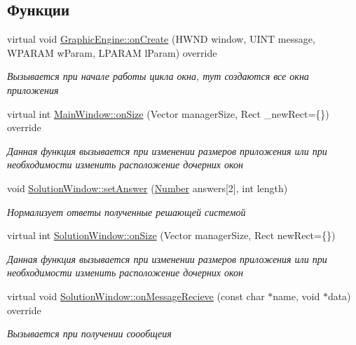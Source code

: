 \subsection*{Функции}
\begin{DoxyCompactItemize}
\item 
virtual void \hyperlink{group___u_i_ga153ee021b4561079e10d503826635a0f}{GraphicEngine::onCreate} (HWND window, UINT message, WPARAM wParam, LPARAM lParam) override
\begin{DoxyCompactList}\small\item\em Вызывается при начале работы цикла окна, тут создаются все окна приложения \item\end{DoxyCompactList}\item 
virtual int \hyperlink{group___u_i_gae135fdc461d4d39e884509fae4064aa5}{MainWindow::onSize} (Vector managerSize, Rect \_\-newRect=\{\}) override
\begin{DoxyCompactList}\small\item\em Данная функция вызывается при изменении размеров приложения или при необходимости изменить расположение дочерних окон \item\end{DoxyCompactList}\item 
void \hyperlink{group___u_i_gade5ec3301160d71543861fa5ff304b65}{SolutionWindow::setAnswer} (\hyperlink{struct_number}{Number} answers\mbox{[}2\mbox{]}, int length)
\begin{DoxyCompactList}\small\item\em Нормализует ответы полученные решающей системой \item\end{DoxyCompactList}\item 
virtual int \hyperlink{group___u_i_ga1c03a2ee74011c0a074af627afb8ed2f}{SolutionWindow::onSize} (Vector managerSize, Rect newRect=\{\})
\begin{DoxyCompactList}\small\item\em Данная функция вызывается при изменении размеров приложения или при необходимости изменить расположение дочерних окон \item\end{DoxyCompactList}\item 
virtual void \hyperlink{group___u_i_ga2d8d20928bef617e08770ec8d021fdcb}{SolutionWindow::onMessageRecieve} (const char $\ast$name, void $\ast$data) override
\begin{DoxyCompactList}\small\item\em Вызывается при получении соообщеия \item\end{DoxyCompactList}\end{DoxyCompactItemize}
